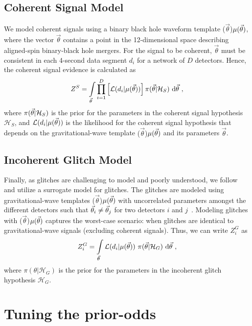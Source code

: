 \documentclass[
 nofootinbib,
 amsmath,amssymb,
 aps,
 twocolumn,
 superscriptaddress
]{revtex4-2}
\newcommand{\mathcmd}[1]{{\sc \relax\ifmmode#1\else $#1$\fi}\xspace}
\newcommand{\parameters}{\mathcmd{\vec{\theta}}}
\newcommand{\template}{\mathcmd{\mu(\parameters)}}
\begin{document}
\subsection{Coherent Signal Model}
We model coherent signals using a binary black hole waveform template \template, where the vector \parameters contains a point in the 12-dimensional space describing aligned-spin binary-black hole mergers. For the signal to be coherent, \parameters must be consistent in each 4-second data segment $d_i$ for a network of $D$ detectors. Hence, the coherent signal evidence is calculated as
\begin{equation}
\label{eq:zs}
Z^S = \int\limits_{\parameters} \prod\limits^{D}_{i=1} \left[ \mathcal{L}(d_i|\template)\right] \pi(\parameters | \mathcal{H}_S)\  \text{d}\parameters \ ,
\end{equation}
where $\pi(\parameters| \mathcal{H}_S)$ is the prior for the parameters in the coherent signal hypothesis $\mathcal{H}_S$, and $\mathcal{L}(d_i|\template)$ is the likelihood for the coherent signal hypothesis that depends on the gravitational-wave template \template and its parameters \parameters. 

\subsection{Incoherent Glitch Model}
Finally, as glitches are challenging to model and poorly understood, we follow \citet{bci} and utilize a surrogate model for glitches. The glitches are modeled using gravitational-wave templates  \template with uncorrelated parameters amongst the different detectors such that  $\parameters_i \neq \parameters_j$ for two detectors $i$ and $j$~\cite{bci}.  Modeling glitches with \template captures the worst-case scenario: when glitches are identical to gravitational-wave signals (excluding coherent signals). Thus, we can write $Z^G_i$ as 
\begin{equation}
\label{eq:zg}
Z^G_i = \int\limits_{\parameters} \mathcal{L}(d_i|\template)\ \pi(\parameters| \mathcal{H}_G)\  \text{d}\parameters  \ ,
\end{equation}
where $\pi(\theta| \mathcal{H}_G)$ is the prior for the parameters in the incoherent glitch hypothesis $\mathcal{H}_G$. 



\section{Tuning the prior-odds}\label{apdx:tuning-prior-odds}
\end{document}
